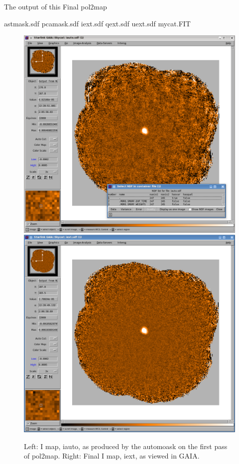 The output of this Final pol2map


\begin{terminalv}
astmask.sdf
pcamask.sdf
iext.sdf
qext.sdf
uext.sdf
mycat.FIT

\end{terminalv}


\begin{figure}[t!]
\begin{center}
\includegraphics[width=0.46\linewidth]{sc22-gaia-view-iauto.png}
\includegraphics[width=0.46\linewidth]{sc22-gaia-view-iext.png}
\label{fig:gaia-iext}
\caption [Final I map in GAIA]{
  \small Left: I map, iauto, as produced by the automoask on the first pass of pol2map. Right: Final I map, iext, as viewed in GAIA.
}
\end{center}
\end{figure}


